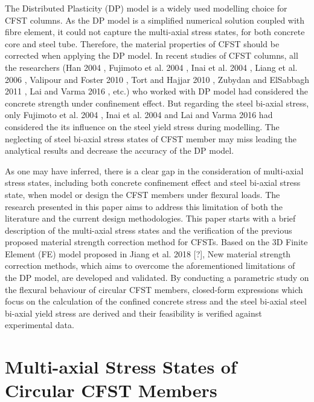 \documentclass[12pt,a4]{article}
\begin{document}
	\par
	The Distributed Plasticity (DP) model is a widely used modelling choice for CFST columns. As the DP model is a simplified numerical solution coupled with fibre element, it could not capture the multi-axial stress states, for both concrete core and steel tube. Therefore, the material properties of CFST should be corrected when applying the DP model. In recent studies of CFST columns, all the researchers (Han 2004 \cite{RN21}, Fujimoto et al. 2004 \cite{RN15}, Inai et al. 2004 \cite{RN30}, Liang et al. 2006 \cite{RN34}, Valipour and Foster 2010 \cite{RN50}, Tort and Hajjar 2010 \cite{RN46}, Zubydan and ElSabbagh 2011 \cite{RN60}, Lai and Varma 2016 \cite{RN32}, etc.) who worked with DP model had considered the concrete strength under confinement effect. But regarding the steel bi-axial stress, only Fujimoto et al. 2004 \cite{RN15}, Inai et al. 2004 \cite{RN30} and Lai and Varma 2016 \cite{RN32} had considered the its influence on the steel yield stress during modelling. The neglecting of steel bi-axial stress states of CFST member may miss leading the analytical results and decrease the accuracy of the DP model. 
	\par
	As one may have inferred, there is a clear gap in the consideration of multi-axial stress states, including both concrete confinement effect and steel bi-axial stress state, when model or design the CFST members under flexural loads. The research presented in this paper aims to address this limitation of both the literature and the current design methodologies. This paper starts with a brief description of the multi-axial stress states and the verification of the previous proposed material strength correction method for CFSTs. Based on the 3D Finite Element (FE) model proposed in Jiang et al. 2018 [?], New material strength correction methods, which aims to overcome the aforementioned limitations of the DP model, are developed and validated. By conducting a parametric study on the flexural behaviour of circular CFST members, closed-form expressions which focus on the calculation of the confined concrete stress and the steel bi-axial steel bi-axial yield stress are derived and their feasibility is verified against experimental data.
	
	\section{Multi-axial Stress States of Circular CFST Members}
\end{document}

